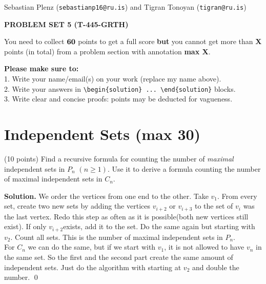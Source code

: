 \documentclass[a4paper,11pt]{amsart}
\newcounter{temp}
\newcounter{prob_counter}
\newenvironment{problem}
{\begin{list}{{\bf \arabic{prob_counter}}}{
      \usecounter{prob_counter}
      \addtolength{\labelsep}{.6ex}
      \addtolength{\itemsep}{4.3ex}
      \setlength{\leftmargin}{1.4em}}
      \setcounter{prob_counter}{\value{temp}}
}
{\setcounter{temp}{\value{prob_counter}}  
  \end{list}
}
\newenvironment{solution}{\textbf{Solution.}}{\qed}
\newcommand{\rubrik}[1]{\bigskip \begin{center}{\bf #1}\end{center} \medskip}
\begin{document}
\pagestyle{empty}
\thispagestyle{empty}

{\small{\sc\noindent
        Sebastian Plenz ({\tt sebastianp16@ru.is}) and Tigran Tonoyan ({\tt tigran@ru.is})
}}

\rubrik{PROBLEM SET 5 (T-445-GRTH)}

You need to collect $\bf 60$ points to get a full score {\bf but} you cannot get more than {\bf X} points (in total) from a problem section with annotation {\bf max X}.

{\bf Please make sure to:}\\
1. Write your name/email(s) on your work (replace my name above).\\
2. Write your answers in \texttt{{\textbackslash}begin\{solution\} ... {\textbackslash}end\{solution\}} blocks.\\
3. Write clear and concise proofs: points may be deducted for vagueness.




\section{Independent Sets ({\bf max 30})}

\begin{problem}
 \item (10 points) Find a recursive formula for counting the number of \emph{maximal} independent sets in $P_n$ $(n\ge 1)$. Use it to derive a formula counting the number of maximal independent sets in $C_n$. 
\end{problem}

\begin{solution}
	We order the vertices from one end to the other. Take $v_1$. From every set, create two new sets by adding the vertices $v_{i+2}$ or $v_{i+3}$ to the set of $v_i$ was the last vertex. Redo this step as often as it is possible(both new vertices still exist). If only $v_{i+2}$exists, add it to the set. Do the same again but starting with $v_2$. Count all sets. This is the number of maximal independent sets in $P_n$. \\
	For $C_n$ we can do the same, but if we start with $v_1$, it is not allowed to have $v_n$ in the same set. So the first and the second part create the same amount of independent sets. Just do the algorithm with starting at $v_2$ and double the number. 
\end{solution}
\end{document}
